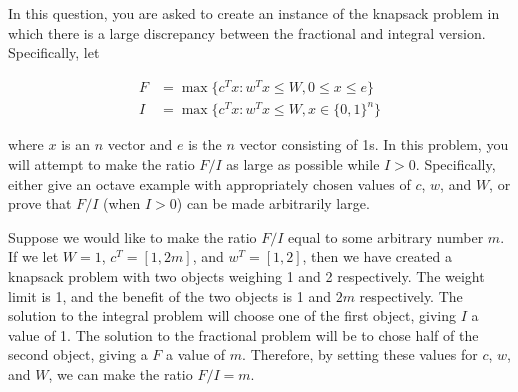 \documentclass[fleqn]{homework}
\begin{document}
  \begin{problem}{6}
    \begin{question}
      In this question, you are asked to create an instance of the knapsack
      problem in which there is a large discrepancy between the fractional and
      integral version.  Specifically, let

      \begin{align*}
        F &= \max \{c^T x: w^T x \leq W, 0 \leq x \leq e\}\\
        I &= \max \{c^T x: w^T x \leq W, x\in\{0,1\}^n\}
      \end{align*}

      where $x$ is an $n$ vector and $e$ is the $n$ vector consisting of 1s.  In
      this problem, you will attempt to make the ratio $F/I$ as large as
      possible while $I>0$.  Specifically, either give an octave example with
      appropriately chosen values of $c$, $w$, and $W$, or prove that $F/I$
      (when $I>0$) can be made arbitrarily large.
    \end{question}

    Suppose we would like to make the ratio $F/I$ equal to some arbitrary number
    $m$.  If we let $W=1$, $c^T = [1, 2m]$, and $w^T = [1, 2]$, then we have
    created a knapsack problem with two objects weighing 1 and 2 respectively.
    The weight limit is 1, and the benefit of the two objects is 1 and $2m$
    respectively.  The solution to the integral problem will choose one of the
    first object, giving $I$ a value of 1.  The solution to the fractional
    problem will be to chose half of the second object, giving a $F$ a value of
    $m$.  Therefore, by setting these values for $c$, $w$, and $W$, we can make
    the ratio $F/I = m$.
  \end{problem}
\end{document}
